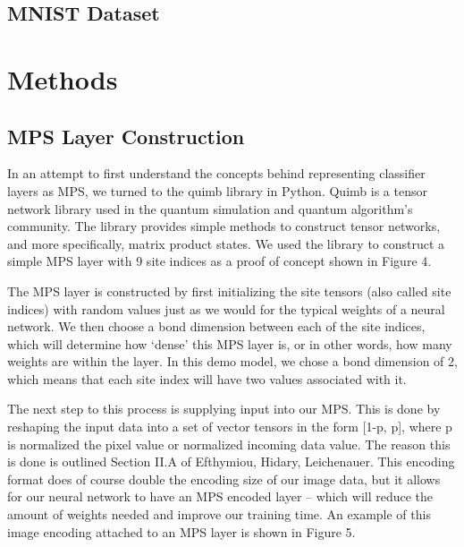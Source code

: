 \documentclass{ipgpmaster}
\begin{document}
\subsection{MNIST Dataset}
\section{Methods}
\subsection{MPS Layer Construction}
In an attempt to first understand the concepts behind representing classifier layers as MPS, we turned to the quimb library in Python. Quimb is a tensor network library used in the quantum simulation and quantum algorithm's community. The library provides simple methods to construct tensor networks, and more specifically, matrix product states. We used the library to construct a simple MPS layer with 9 site indices as a proof of concept shown in Figure 4. 

The MPS layer is constructed by first initializing the site tensors (also called site indices) with random values just as we would for the typical weights of a neural network. We then choose a bond dimension between each of the site indices, which will determine how `dense' this MPS layer is, or in other words, how many weights are within the layer. In this demo model, we chose a bond dimension of 2, which means that each site index will have two values associated with it. 

The next step to this process is supplying input into our MPS. This is done by reshaping the input data into a set of vector tensors in the form [1-p, p], where p is normalized the pixel value or normalized incoming data value. The reason this is done is outlined Section II.A of Efthymiou, Hidary, Leichenauer. This encoding format does of course double the encoding size of our image data, but it allows for our neural network to have an MPS encoded layer -- which will reduce the amount of weights needed and improve our training time. An example of this image encoding attached to an MPS layer is shown in Figure 5.

\nocite{*}
\end{document}
